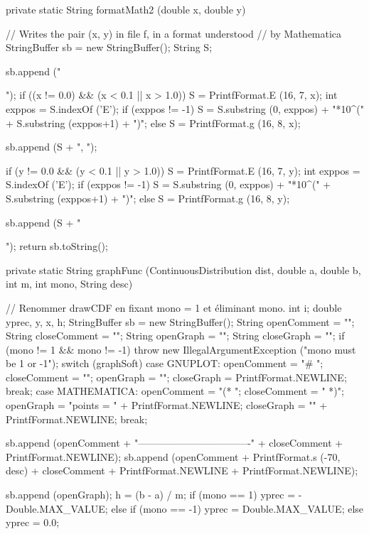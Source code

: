 \begin{code}
\begin{hide}
   private static String formatMath2 (double x, double y)    {
      // Writes the pair (x, y) in file f, in a format understood
      // by Mathematica
      StringBuffer sb = new StringBuffer();
      String S;

      sb.append ("   { ");
      if ((x != 0.0) && (x < 0.1 || x > 1.0)) {
         S = PrintfFormat.E (16, 7, x);
         int exppos = S.indexOf ('E');
         if (exppos != -1)
            S = S.substring (0, exppos) + "*10^(" +
                             S.substring (exppos+1) + ")";
      }
      else
         S = PrintfFormat.g (16, 8, x);

      sb.append (S + ",     ");

      if (y != 0.0 && (y < 0.1 || y > 1.0)) {
         S = PrintfFormat.E (16, 7, y);
         int exppos = S.indexOf ('E');
         if (exppos != -1)
            S = S.substring (0, exppos) + "*10^(" +
                             S.substring (exppos+1) + ")";
      }
      else
        S = PrintfFormat.g (16, 8, y);

      sb.append (S + " }");
      return sb.toString();
   }


   private static String graphFunc (ContinuousDistribution dist, double a,
                                    double b, int m, int mono, String desc) {
// Renommer drawCDF en fixant mono = 1 et éliminant mono.
      int i;
      double yprec, y, x, h;
      StringBuffer sb = new StringBuffer();
      String openComment = "";
      String closeComment = "";
      String openGraph = "";
      String closeGraph = "";
      if (mono != 1 && mono != -1)
         throw new IllegalArgumentException ("mono must be 1 or -1");
      switch (graphSoft) {
      case GNUPLOT:
        openComment = "# ";
        closeComment = "";
        openGraph = "";
        closeGraph = PrintfFormat.NEWLINE;
        break;
      case MATHEMATICA:
        openComment = "(* ";
        closeComment = " *)";
        openGraph = "points = { " + PrintfFormat.NEWLINE;
        closeGraph = "}" + PrintfFormat.NEWLINE;
        break;
      }

      sb.append (openComment + "----------------------------------" +
                   closeComment  + PrintfFormat.NEWLINE);
      sb.append (openComment + PrintfFormat.s (-70, desc)
                 + closeComment  + PrintfFormat.NEWLINE +
                   PrintfFormat.NEWLINE);

      sb.append (openGraph);
      h = (b - a) / m;
      if (mono == 1)
         yprec = -Double.MAX_VALUE;
      else if (mono == -1)
         yprec = Double.MAX_VALUE;
      else
         yprec = 0.0;

}
\end{hide}
\end{code}
